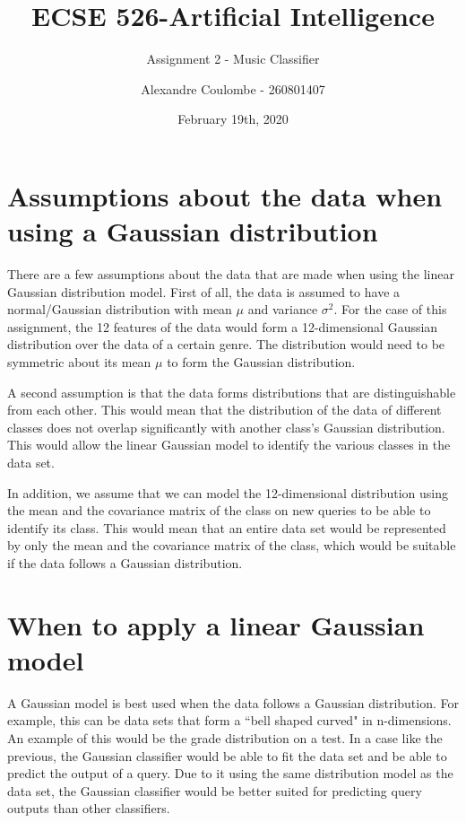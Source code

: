 \documentclass[11pt]{scrartcl}
\begin{document}
\title{ECSE 526-Artificial Intelligence}
\subtitle{Assignment 2 - Music Classifier}
\author{Alexandre Coulombe - 260801407}
\date{February 19th, 2020}
\maketitle



\section{Assumptions about the data when using a Gaussian distribution}

There are a few assumptions about the data that are made when using the linear Gaussian distribution model. First of all, the data is assumed to have a normal/Gaussian distribution with mean $\mu$ and variance $\sigma^2$. For the case of this assignment, the 12 features of the data would form a 12-dimensional Gaussian distribution over the data of a certain genre. The distribution would need to be symmetric about its mean $\mu$ to form the Gaussian distribution. 

A second assumption is that the data forms distributions that are distinguishable from each other. This would mean that the distribution of the data of different classes does not overlap significantly with another class's Gaussian distribution. This would allow the linear Gaussian model to identify the various classes in the data set.

In addition, we assume that we can model the 12-dimensional distribution using the mean and the covariance matrix of the class on new queries to be able to identify its class. This would mean that an entire data set would be represented by only the mean and the covariance matrix of the class, which would be suitable if the data follows a Gaussian distribution. 

\section{When to apply a linear Gaussian model}

A Gaussian model is best used when the data follows a Gaussian distribution. For example, this can be data sets that form a ``bell shaped curved" in n-dimensions. An example of this would be the grade distribution on a test. In a case like the previous, the Gaussian classifier would be able to fit the data set and be able to predict the output of a query. Due to it using the same distribution model as the data set, the Gaussian classifier would be better suited for predicting query outputs than other classifiers.
\end{document}

